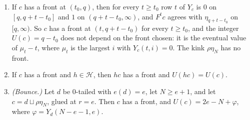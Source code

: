 \begin{lemma}\label{cl:lem:bounce}
\begin{enumerate}
\item[(a)] If $c$ has a front at $(t_0,q)$, then for every $t\ge t_0$ row $t$ of $Y_c$ is $0$ on $[q,q+t-t_0]$ and $1$ on $(q+t-t_0,\infty)$, and $F^tc$ agrees with $\eta_{q+t-t_0}$ on $[q,\infty)$. So $c$ has a front at $(t,q+t-t_0)$ for every $t\ge t_0$, and the integer $U(c)=q-t_0$ does not depend on the front chosen: it is the eventual value of $\mu_t-t$, where $\mu_t$ is the largest $i$ with $Y_c(t,i)=0$. The kink $\rho\eta_N$ has no front.
\item[(b)] If $c$ has a front and $h\in\mathcal H$, then $hc$ has a front and $U(hc)=U(c)$.
\item[(c)] \emph{(Bounce.)} Let $d$ be $0$-tailed with $e(d)=e$, let $N\ge e+1$, and let $c=d\sqcup\rho\eta_N$, glued at $r=e$. Then $c$ has a front, and $U(c)=2e-N+\varphi$, where $\varphi=Y_d(N-e-1,e)$.
\end{enumerate}
\end{lemma}

